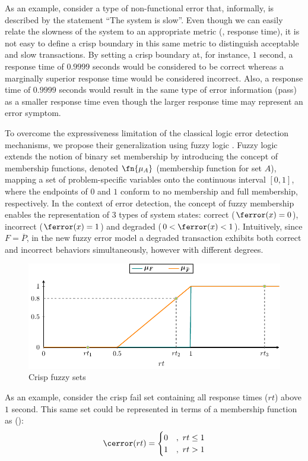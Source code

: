 As an example, consider a type of non-functional error that,
informally, is described by the statement ``The system is slow''.
%
Even though we can easily relate the slowness of the system to an
appropriate metric (\eg, response time), it is not easy to define a
crisp boundary in this same metric to distinguish acceptable and slow
transactions.
%
By setting a crisp boundary at, for instance, $1$ second, a response
time of $0.9999$ seconds would be considered to be correct whereas a
marginally superior response time would be considered incorrect.
%
Also, a response time of $0.9999$ seconds would result in the same
type of error information (pass) as a smaller response time even
though the larger response time may represent an error symptom.
%

To overcome the expressiveness limitation of the classical logic error
detection mechanisms, we propose their generalization using fuzzy
logic \citep{Zadeh65}.
%
Fuzzy logic extends the notion of binary set membership by introducing
the concept of membership functions, denoted $\fn{\mu_A}$ (membership
function for set $A$), mapping a set of problem-specific variables
onto the continuous interval $[0, 1]$, where the endpoints of $0$ and
$1$ conform to no membership and full membership, respectively.
%
In the context of error detection, the concept of fuzzy membership
enables the representation of $3$ types of system states: correct
($\ferror(x) = 0$), incorrect ($\ferror(x) = 1$) and degraded
($0 < \ferror(x) < 1$).
%
Intuitively, since $F = \overline{P}$, in the new fuzzy error model a
degraded transaction exhibits both correct and incorrect behaviors
simultaneously, however with different degrees.
%

\begin{figure}[!ht]
  \includegraphics[page=1]{figures/fuzzinel/figures/main.pdf}
  \caption{Crisp \vs{} fuzzy sets\label{fig:fuzzinel:crisp-vs-fuzzy}}
\end{figure}


As an example, consider the crisp fail set containing all response
times ($rt$) above $1$ second.
%
This same set could be represented in terms of a membership function
as ():
\begin{equation}
  \cerror(rt) =
  \begin{cases}
    0 &,\ rt \leq 1 \\
    1 &,\ rt > 1
  \end{cases}
\end{equation}
%

